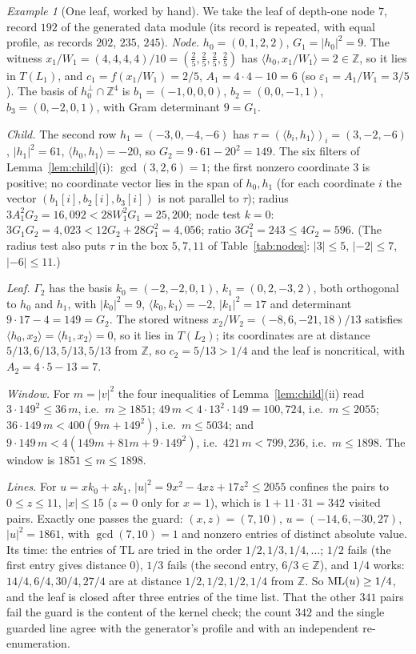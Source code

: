 \documentclass[11pt]{article}
\theoremstyle{remark}
\newtheorem{example}[theorem]{Example}
\newcommand{\Z}{\mathbb{Z}}
\begin{document}
\begin{example}[One leaf, worked by hand]\label{ex:leaf}
We take the leaf of depth-one node $7$, record $192$ of the generated data module (its record is repeated, with equal profile, as records $202$, $235$, $245$). \emph{Node.} $h_0=(0,1,2,2)$, $G_1=|h_0|^2=9$. The witness $x_1/W_1=(4,4,4,4)/10=(\tfrac25,\tfrac25,\tfrac25,\tfrac25)$ has $\langle h_0,x_1/W_1\rangle=2\in\Z$, so it lies in $T(L_1)$, and $c_1=f(x_1/W_1)=2/5$, $A_1=4\cdot4-10=6$ (so $\varepsilon_1=A_1/W_1=3/5$). The basis of $h_0^\perp\cap\Z^4$ is $b_1=(-1,0,0,0)$, $b_2=(0,0,-1,1)$, $b_3=(0,-2,0,1)$, with Gram determinant $9=G_1$.

\emph{Child.} The second row $h_1=(-3,0,-4,-6)$ has $\tau=(\langle b_i,h_1\rangle)_i=(3,-2,-6)$, $|h_1|^2=61$, $\langle h_0,h_1\rangle=-20$, so $G_2=9\cdot61-20^2=149$. The six filters of Lemma~\ref{lem:child}(i): $\gcd(3,2,6)=1$; the first nonzero coordinate $3$ is positive; no coordinate vector lies in the span of $h_0,h_1$ (for each coordinate $i$ the vector $(b_1[i],b_2[i],b_3[i])$ is not parallel to $\tau$); radius $3A_1^2G_2=16{,}092<28W_1^2G_1=25{,}200$; node test $k=0$: $3G_1G_2=4{,}023<12G_2+28G_1^2=4{,}056$; ratio $3G_1^2=243\le4G_2=596$. (The radius test also puts $\tau$ in the box $5,7,11$ of Table~\ref{tab:nodes}: $|3|\le5$, $|-2|\le7$, $|-6|\le11$.)

\emph{Leaf.} $\Gamma_2$ has the basis $k_0=(-2,-2,0,1)$, $k_1=(0,2,-3,2)$, both orthogonal to $h_0$ and $h_1$, with $|k_0|^2=9$, $\langle k_0,k_1\rangle=-2$, $|k_1|^2=17$ and determinant $9\cdot17-4=149=G_2$. The stored witness $x_2/W_2=(-8,6,-21,18)/13$ satisfies $\langle h_0,x_2\rangle=\langle h_1,x_2\rangle=0$, so it lies in $T(L_2)$; its coordinates are at distance $5/13,6/13,5/13,5/13$ from $\Z$, so $c_2=5/13>1/4$ and the leaf is noncritical, with $A_2=4\cdot5-13=7$.

\emph{Window.} For $m=|v|^2$ the four inequalities of Lemma~\ref{lem:child}(ii) read $3\cdot149^2\le36\,m$, i.e.\ $m\ge1851$; $49\,m<4\cdot13^2\cdot149=100{,}724$, i.e.\ $m\le2055$; $36\cdot149\,m<400(9m+149^2)$, i.e.\ $m\le5034$; and $9\cdot149\,m<4(149m+81m+9\cdot149^2)$, i.e.\ $421\,m<799{,}236$, i.e.\ $m\le1898$. The window is $1851\le m\le1898$.

\emph{Lines.} For $u=xk_0+zk_1$, $|u|^2=9x^2-4xz+17z^2\le2055$ confines the pairs to $0\le z\le11$, $|x|\le15$ ($z=0$ only for $x=1$), which is $1+11\cdot31=342$ visited pairs. Exactly one passes the guard: $(x,z)=(7,10)$, $u=(-14,6,-30,27)$, $|u|^2=1861$, with $\gcd(7,10)=1$ and nonzero entries of distinct absolute value. Its time: the entries of $\mathrm{TL}$ are tried in the order $1/2,1/3,1/4,\dots$; $1/2$ fails (the first entry gives distance $0$), $1/3$ fails (the second entry, $6/3\in\Z$), and $1/4$ works: $14/4,6/4,30/4,27/4$ are at distance $1/2,1/2,1/2,1/4$ from $\Z$. So $\mathrm{ML}(u)\ge1/4$, and the leaf is closed after three entries of the time list. That the other $341$ pairs fail the guard is the content of the kernel check; the count $342$ and the single guarded line agree with the generator's profile and with an independent re-enumeration.
\end{example}
\end{document}
